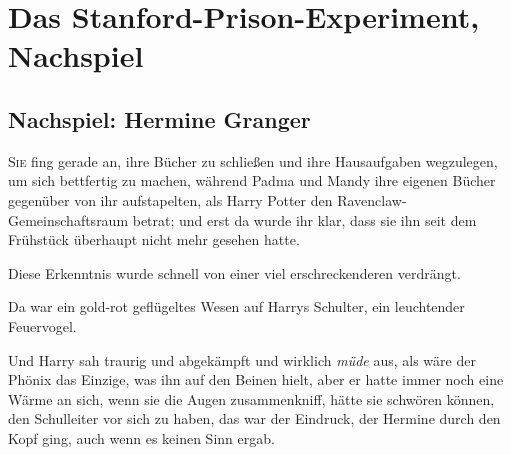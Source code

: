 \chapter{Das Stanford-Prison-Experiment, Nachspiel}

\section{Nachspiel: Hermine Granger}

\lettrine{S}{ie} fing gerade an, ihre Bücher zu schließen und ihre Hausaufgaben wegzulegen, um sich bettfertig zu machen, während Padma und Mandy ihre eigenen Bücher gegenüber von ihr aufstapelten, als Harry Potter den Ravenclaw-Gemeinschaftsraum betrat; und erst da wurde ihr klar, dass sie ihn seit dem Frühstück überhaupt nicht mehr gesehen hatte.

Diese Erkenntnis wurde schnell von einer viel erschreckenderen verdrängt.

Da war ein gold-rot geflügeltes Wesen auf Harrys Schulter, ein leuchtender Feuervogel.

Und Harry sah traurig und abgekämpft und wirklich \emph{müde} aus, als wäre der Phönix das Einzige, was ihn auf den Beinen hielt, aber er hatte immer noch eine Wärme an sich, wenn sie die Augen zusammenkniff, hätte sie schwören können, den Schulleiter vor sich zu haben, das war der Eindruck, der Hermine durch den Kopf ging, auch wenn es keinen Sinn ergab.

